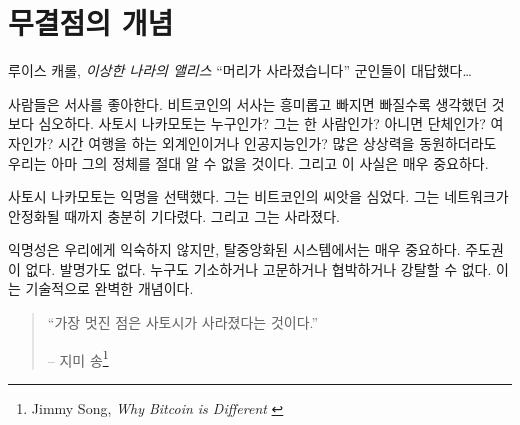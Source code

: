 \chapter{무결점의 개념}
\label{les:5}

\begin{chapquote}{루이스 캐롤, \textit{이상한 나라의 앨리스}}
\enquote{머리가 사라졌습니다} 군인들이 대답했다\ldots
\end{chapquote}

사람들은 서사를 좋아한다. 
비트코인의 서사는 흥미롭고 빠지면 빠질수록 생각했던 것보다 심오하다. 
사토시 나카모토는 누구인가? 그는 한 사람인가? 아니면 단체인가? 여자인가? 
시간 여행을 하는 외계인이거나 인공지능인가? 
많은 상상력을 동원하더라도 우리는 아마 그의 정체를 절대 알 수 없을 것이다.
그리고 이 사실은 매우 중요하다.

사토시 나카모토는 익명을 선택했다. 
그는 비트코인의 씨앗을 심었다. 
그는 네트워크가 안정화될 때까지 충분히 기다렸다.
그리고 그는 사라졌다.

익명성은 우리에게 익숙하지 않지만, 탈중앙화된 시스템에서는 매우 중요하다.
주도권이 없다.
발명가도 없다. 
누구도 기소하거나 고문하거나 협박하거나 강탈할 수 없다. 
이는 기술적으로 완벽한 개념이다.

\begin{quotation}\begin{samepage}
\enquote{가장 멋진 점은 사토시가 사라졌다는 것이다.}
\begin{flushright} -- 지미 송\footnote{Jimmy Song, \textit{Why Bitcoin is Different} \cite{bitcoin-different}}
\end{flushright}\end{samepage}\end{quotation}

\newpage


